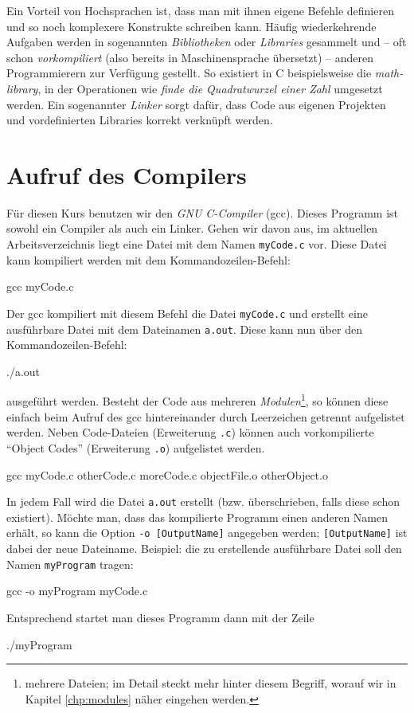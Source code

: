 Ein Vorteil von Hochsprachen ist, dass man mit ihnen eigene Befehle definieren und so noch komplexere Konstrukte schreiben kann. Häufig wiederkehrende Aufgaben werden in sogenannten \emph{Bibliotheken} oder \emph{Libraries} gesammelt und -- oft schon \emph{vorkompiliert} (also bereits in Maschinensprache  übersetzt) -- anderen Programmierern zur Verfügung gestellt. So existiert in C beispielsweise die  \emph{math-library}, in der Operationen wie \emph{finde die Quadratwurzel einer Zahl} umgesetzt werden. Ein sogenannter \emph{Linker} sorgt dafür, dass Code aus eigenen Projekten und vordefinierten Libraries korrekt verknüpft werden.

\section{Aufruf des Compilers} \label{sec:Compile}
Für diesen Kurs benutzen wir den \emph{GNU C-Compiler} (gcc). Dieses Programm ist sowohl ein Compiler als auch ein Linker. Gehen wir davon aus, im aktuellen Arbeitsverzeichnis liegt eine Datei mit dem Namen \texttt{myCode.c} vor. Diese Datei kann kompiliert werden mit dem Kommandozeilen-Befehl:
\begin{cmdbox}
gcc myCode.c
\end{cmdbox}

Der gcc kompiliert mit diesem Befehl die Datei \texttt{myCode.c} und erstellt eine ausführbare Datei mit dem Dateinamen \texttt{a.out}. Diese kann nun über den Kommandozeilen-Befehl:
\begin{cmdbox}
./a.out
\end{cmdbox}
ausgeführt werden. Besteht der Code aus mehreren \emph{Modulen}\footnote{\ie mehrere Dateien; im Detail steckt mehr hinter diesem Begriff, worauf wir in Kapitel \ref{chp:modules} näher eingehen werden.}, so können diese einfach beim Aufruf des gcc hintereinander durch Leerzeichen getrennt aufgelistet werden. Neben Code-Dateien (Erweiterung \texttt{.c}) können auch vorkompilierte \enquote{Object Codes} (Erweiterung \texttt{.o}) aufgelistet werden.
\begin{cmdbox}
gcc myCode.c otherCode.c moreCode.c objectFile.o otherObject.o
\end{cmdbox}

In jedem Fall wird die Datei \texttt{a.out} erstellt (bzw. überschrieben, falls diese schon existiert). Möchte man, dass das kompilierte Programm einen anderen Namen erhält, so kann die Option \texttt{-o [OutputName]} angegeben werden; \texttt{[OutputName]} ist dabei der neue Dateiname. Beispiel: die zu erstellende ausführbare Datei soll den Namen \texttt{myProgram} tragen:
\begin{cmdbox}
gcc -o myProgram myCode.c
\end{cmdbox}
Entsprechend startet man dieses Programm dann mit der Zeile
\begin{cmdbox}
./myProgram
\end{cmdbox}

